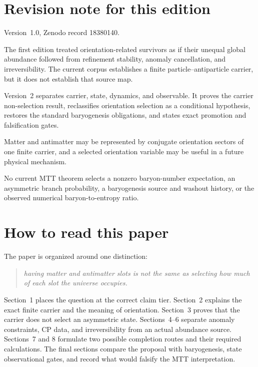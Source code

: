 \documentclass[11pt]{article}
\theoremstyle{definition}
\theoremstyle{remark}
\begin{document}
\section*{Revision note for this edition}
\begin{description}[leftmargin=2.6cm,style=nextline]
\item[Supersedes.]
Version~1.0, Zenodo record 18380140.

\item[Reason.]
The first edition treated orientation-related survivors as if their unequal
global abundance followed from refinement stability, anomaly cancellation,
and irreversibility.  The current corpus establishes a finite
particle--antiparticle carrier, but it does not establish that source map.

\item[Resolution.]
Version~2 separates carrier, state, dynamics, and observable.  It proves the
carrier non-selection result, reclassifies orientation selection as a
conditional hypothesis, restores the standard baryogenesis obligations, and
states exact promotion and falsification gates.

\item[Retained content.]
Matter and antimatter may be represented by conjugate orientation sectors of
one finite carrier, and a selected orientation variable may be useful in a
future physical mechanism.

\item[Open boundary.]
No current MTT theorem selects a nonzero baryon-number expectation, an
asymmetric branch probability, a baryogenesis source and washout history, or
the observed numerical baryon-to-entropy ratio.
\end{description}

\section*{How to read this paper}
The paper is organized around one distinction:
\begin{quote}
\emph{having matter and antimatter slots is not the same as selecting how much
of each slot the universe occupies.}
\end{quote}
Section~1 places the question at the correct claim tier.  Section~2 explains
the exact finite carrier and the meaning of orientation.  Section~3 proves
that the carrier does not select an asymmetric state.  Sections~4--6 separate
anomaly constraints, CP data, and irreversibility from an actual abundance
source.  Sections~7 and 8 formulate two possible completion routes and their
required calculations.  The final sections compare the proposal with
baryogenesis, state observational gates, and record what would falsify the
MTT interpretation.
\end{document}
